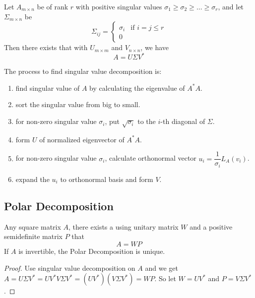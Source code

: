 \begin{theorem}
    Let $A_{m \times n}$ be of rank $r$ with positive singular values $\sigma_1 \geq \sigma_2 \geq \dots \geq \sigma_r$, and let $\Sigma_{m \times n}$ be
    \begin{equation}
        \Sigma_{ij} = \begin{cases}
            \sigma_i & \text{if } i = j \leq r \\
            0
        \end{cases}
    \end{equation}
    Then there exists  that with $U_{m \times m}$ and $V_{n \times n}$, we have
    \begin{equation}
        A = U \Sigma V^*
    \end{equation}
    
    The process to find singular value decomposition is:
    \begin{enumerate}
        \item find singular value of $A$ by calculating the eigenvalue of $A^*A$.
        \item sort the singular value from big to small.
        \item for non-zero singular value $\sigma_i$, put $\sqrt{\sigma_i}$ to the $i$-th diagonal of $\Sigma$.
        \item form $U$ of normalized eigenvector of $A^*A$.
        \item for non-zero singular value $\sigma_i$, calculate orthonormal vector $u_i = \dfrac{1}{\sigma_i} L_A(v_i)$.
        \item expand the $u_i$ to orthonormal basis and form $V$.
    \end{enumerate}
\end{theorem}



\subsection{Polar Decomposition}

\begin{theorem}
    Any square matrix $A$, there exists a  using unitary matrix $W$ and a positive semidefinite matrix $P$ that 
    \begin{equation}
        A = WP
    \end{equation}
    If $A$ is invertible, the Polar Decomposition is unique.
\end{theorem}
\begin{proof}
    Use singular value decomposition on $A$ and we get $A = U \Sigma V^* = U V^* V \Sigma V^* = ( U V^*) ( V \Sigma V^*) =  WP$.
    So let $W = U V^*$ and $P = V \Sigma V^*$.
\end{proof}



